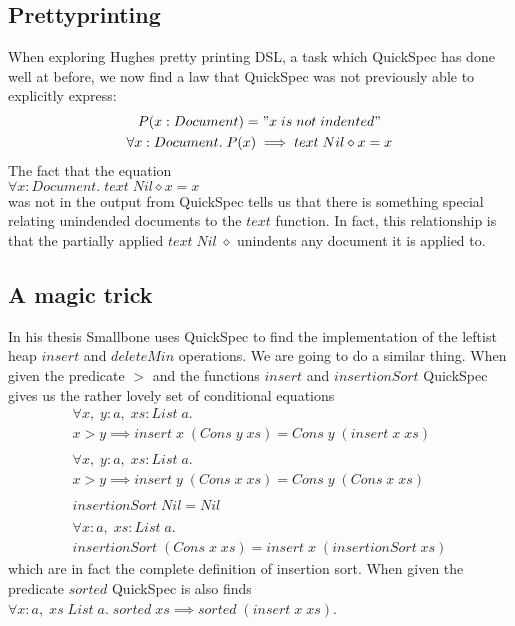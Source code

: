 \subsection{Prettyprinting}
    When exploring Hughes pretty printing DSL, %
    a task which QuickSpec has done well at before, we now find a law that QuickSpec
    was not previously able to explicitly express:
    \begin{gather*}
        P(x:Document) = "x\; is\; not\; indented"\\
        \forall x:Document.\; P(x)\implies text\;Nil\diamond x=x
    \end{gather*}
    The fact that the equation\\
    $\forall x:Document.\; text\;Nil\diamond x = x$\\
    was not in the output from QuickSpec tells us that there is something special
    relating unindended documents to the $text$ function. In fact, this relationship
    is that the partially applied $text\;Nil\;\diamond$ unindents any document it is applied to. 

\subsection{A magic trick}
    In his thesis Smallbone %
    uses QuickSpec to find the implementation of the leftist
    heap $insert$ and $deleteMin$ operations. 
    We are going to do a similar thing. When given the predicate
    $>$ and the functions $insert$ and $insertionSort$ QuickSpec gives us
    the rather lovely set of conditional equations
    \begin{gather*}
        \forall x,\;y:a,\; xs:List\; a.\\
        x > y \implies insert\; x\; (Cons\; y\; xs) = Cons\; y\; (insert\; x\; xs)\\\\
        \forall x,\;y:a,\; xs:List\; a.\\
        x > y \implies insert\; y\; (Cons\; x\; xs) = Cons\; y\; (Cons\; x\; xs)\\\\
        insertionSort\; Nil = Nil\\\\
        \forall x:a,\; xs:List\; a.\\
        insertionSort\; (Cons\; x\; xs) = insert\; x\; (insertionSort\; xs)
    \end{gather*}
    which are in fact the complete definition of insertion sort.
    When given the predicate $sorted$ QuickSpec is also finds
    $\forall x:a,\; xs\;List\;a.\; sorted\; xs \implies sorted\; (insert\; x\; xs)$.
